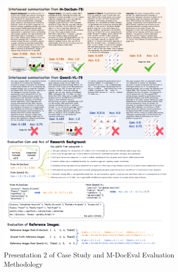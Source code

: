 \begin{figure}[t]
\centering
\includegraphics[width=0.8\textwidth]{figs/case_en_2404_15225}
\caption{Presentation 2 of Case Study and M-DocEval Evaluation Methodology}
\label{fig:case_en_1}
\end{figure}


